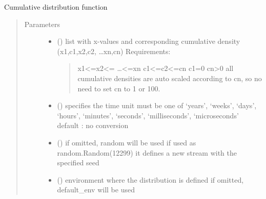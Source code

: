 \documentclass[letterpaper,10pt,english]{sphinxmanual}
\begin{document}

\begin{fulllineitems}
\label{\detokenize{Reference:salabim.Cdf}}
Cumulative distribution function
\begin{quote}\begin{description}
\item[{Parameters}] \leavevmode\begin{itemize}
\item {} 
 () \textendash{} 
list with x-values and corresponding cumulative density
(x1,c1,x2,c2, …xn,cn) 
Requirements:
\begin{quote}

x1\textless{}=x2\textless{}= …\textless{}=xn 
c1\textless{}=c2\textless{}=cn 
c1=0 
cn\textgreater{}0 
all cumulative densities are auto scaled according to cn,
so no need to set cn to 1 or 100.
\end{quote}


\item {} 
 () \textendash{} specifies the time unit 
must be one of ‘years’, ‘weeks’, ‘days’, ‘hours’, ‘minutes’, ‘seconds’, ‘milliseconds’, ‘microseconds’ 
default : no conversion 

\item {} 
 () \textendash{} if omitted, random will be used 
if used as random.Random(12299)
it defines a new stream with the specified seed

\item {} 
 ({\hyperref[\detokenize{Reference:salabim.Environment}]{}}) \textendash{} environment where the distribution is defined 
if omitted, default\_env will be used

\end{itemize}

\end{description}\end{quote}


\end{fulllineitems}
\end{document}
